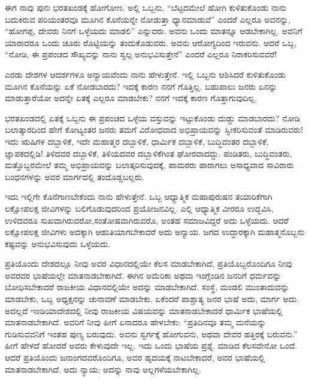 ಈಗ ನಾವು ಪುನಃ ಭರತಖಂಡಕ್ಕೆ ಹೋಗೋಣ. ಅಲ್ಲಿ ಒಬ್ಬನು, “ಬೆಟ್ಟದಮೇಲೆ ಹೋಗಿ ಕುಳಿತುಕೊಂಡು ನಾನು ಬದುಕಿರುವ ಪರಿಯಂತರವೂ ಮೂಗಿನ ಕೊನೆಯನ್ನೇ ನೋಡುತ್ತಾ ಧ್ಯಾನಮಾಡುವೆ” ಎಂದರೆ ಎಲ್ಲರೂ ಅವನನ್ನು, “ಹೋಗಪ್ಪ, ದೇವರು ನಿನಗೆ ಒಳ್ಳೆಯದು ಮಾಡಲಿ” ಎನ್ನುವರು. ಅವನು ಒಂದು ಮಾತನ್ನೂ ಆಡಬೇಕಾಗಿಲ್ಲ. ಅವನಿಗೆ ಯಾರಾದರೂ ಒಂದು ಚೂರು ರೊಟ್ಟಿಯನ್ನು ತಂದುಕೊಡುವರು. ಅವನು ಆರೋಗ್ಯದಿಂದ ಇರುವನು. ಆದರೆ ಒಬ್ಬ, “ನೋಡಿ, ಈ ಪ್ರಪಂಚದ ಸೌಖ್ಯವನ್ನು ನಾನು ಸ್ವಲ್ಪ ಅನುಭವಿಸುತ್ತೇನೆ” ಎಂದರೆ ಎಲ್ಲರೂ ನಿರಾಕರಿಸುವವರೆ!

ಎರಡು ದೇಶಗಳ ಆದರ್ಶಗಳೂ ಅನ್ಯಾಯವೆಂದು ನಾನು ಹೇಳುತ್ತೇನೆ. ಇಲ್ಲಿ ಒಬ್ಬನು ಆಶಿಸಿದರೆ ಕುಳಿತುಕೊಂಡು ಮೂಗಿನ ಕೊನೆಯನ್ನು ಏಕೆ ನೋಡಬಾರದು? ಇದಕ್ಕೆ ಕಾರಣ ನನಗೆ ಗೊತ್ತಿಲ್ಲ. ಬಹುಪಾಲು ಜನರು ಏನನ್ನು ಮಾಡುತ್ತಾರೆಯೋ ಅದನ್ನೇ ಏತಕ್ಕೆ ಎಲ್ಲರೂ ಮಾಡಬೇಕು? ನನಗೆ ಇದಕ್ಕೆ ಕಾರಣ ಗೊತ್ತಾಗುವುದಿಲ್ಲ.

ಭರತಖಂಡದಲ್ಲಿ ಏತಕ್ಕೆ ಒಬ್ಬನು ಈ ಪ್ರಪಂಚದ ಒಳ್ಳೆಯ ವಸ್ತುವನ್ನು ಇಟ್ಟುಕೊಂಡು ದುಡ್ಡು ಮಾಡಬಾರದು? ನೋಡಿ ಬಲಾತ್ಕಾರದಿಂದ ಹೇಗೆ ಕೋಟ್ಯಂತರ ಜನರು ತಮಗೆ ವಿರೋಧವಾದ ಅಭಿಪ್ರಾಯವನ್ನು ಸ್ವೀಕರಿಸುವಂತೆ ಮಾಡಿರುವರು! ಇದು ಋಷಿಗಳ ದಬ್ಬಾಳಿಕೆ, ಇದೇ ಮಹಾತ್ಮರ ದಬ್ಬಾಳಿಕೆ, ಧಾರ್ಮಿಕ ದಬ್ಬಾಳಿಕೆ, ಬುದ್ಧಿವಂತರ ದಬ್ಬಾಳಿಕೆ, ಜ್ಞಾಪಕದಲ್ಲಿಡಿ! ತಿಳಿದವರ ದಬ್ಬಾಳಿಕೆ, ತಿಳಿಯದವರ ದಬ್ಬಾಳಿಕೆಗಿಂತ ಘೋರವಾದದ್ದು. ಪಂಡಿತರು, ಬುದ್ಧಿವಂತರು, ಮತ್ತೊಬ್ಬರಮೇಲೆ ತಮ್ಮ ಅಭಿಪ್ರಾಯವನ್ನು ಬಲಾತ್ಕರಿಸುವುದಕ್ಕೆ, ಪಾಮರರು ಪಾರಾಗಲು ಅಸಾಧ್ಯವಾದ ಸಾವಿರಾರು ಬಂಧನಗಳನ್ನು ಅವರ ಮಾರ್ಗದಲ್ಲಿ ತಂದೊಡ್ಡಬಲ್ಲರು.

ಇದು ಇಲ್ಲಿಗೇ ಕೊನೆಗಾಣಬೇಕೆಂದು ನಾನು ಹೇಳುತ್ತೇನೆ. ಒಬ್ಬ ಆಧ್ಯಾತ್ಮಿಕ ಮಹಾಪುರುಷನ ತಯಾರಿಕೆಗಾಗಿ ಲಕ್ಷೋಪಲಕ್ಷ ಜೀವಿಗಳನ್ನು ಬಲಿಗೊಡುವುದರಿಂದ ಪ್ರಯೋಜನವಿಲ್ಲ. ಎಲ್ಲಿ ಆಧ್ಯಾತ್ಮಿಕ ವೀರರೂ ಉದ್ಭವಿಸಿ, ಉಳಿದವರೂ ಸುಖವಾಗಿರುವರೋ,\break ಸಂತೋಷವಾಗಿರುವರೊ, ಅಂತಹ ಸಮಾಜವಿದ್ದರೆ ಅದು ಒಳ್ಳೆಯದು. ಆದರೆ ಲಕ್ಷೋಪಲಕ್ಷ ಜೀವಿಗಳು ಅದಕ್ಕಾಗಿ ಆಹುತಿಯಾಗಬೇಕಾದರೆ ಅದು ಅನ್ಯಾಯ. ಜಗದ ಉದ್ಧಾರಕ್ಕಾಗಿ ಮಹಾತ್ಮನೊಬ್ಬನು ಕಷ್ಟವನ್ನು ಅನುಭವಿಸುವುದು ಒಳ್ಳೆಯದು.

ಪ್ರತಿಯೊಂದು ದೇಶದಲ್ಲೂ ನೀವು ಅವರ ವಿಧಾನದಲ್ಲಿಯೇ ಕೆಲಸ ಮಾಡಬೇಕಾಗಿದೆ, ಪ್ರತಿಯೊಬ್ಬರೊಂದಿಗೂ ನೀವು ಅವರವರ ಭಾಷೆಯಲ್ಲೇ ಮಾತನಾಡಬೇಕಾಗಿದೆ. ಈಗಿನ ಅಮೆರಿಕಾ ಅಥವಾ ಇಂಗ್ಲೆಂಡಿನ ಜನರಿಗೆ ಧರ್ಮವನ್ನು ಬೋಧಿಸಬೇಕಾದರೆ ರಾಜಕೀಯ ವಿಧಾನದಲ್ಲಿಯೇ ಅದನ್ನು ಮಾಡಬೇಕಾಗಿದೆ. ಸಂಸ್ಥೆ, ಮಂಡಲಿ ಮುಂತಾದುವನ್ನು ಮಾಡಬೇಕು, ಒಬ್ಬ ಅಧ್ಯಕ್ಷನನ್ನು ಚುನಾವಣೆ ಮಾಡಬೇಕು. ಏಕೆಂದರೆ ಪಾಶ್ಚಾತ್ಯ ಜನರ ಭಾಷೆ ಅದು, ಮಾರ್ಗ ಅದು. ಅದಲ್ಲದೆ ಇಂಡಿಯಾದೇಶದಲ್ಲಿ ನೀವು ರಾಜಕೀಯ ವಿಷಯವನ್ನು ಮಾತನಾಡಬೇಕಾದರೆ ಧಾರ್ಮಿಕ ಭಾಷೆಯಲ್ಲಿ ಮಾತನಾಡಬೇಕಾಗಿದೆ. ಅವರಿಗೆ ನೀವು ಹೀಗೆ ಏನಾದರೂ ಹೇಳಬೇಕು: “ಪ್ರತಿದಿನವೂ ತಮ್ಮ ಮನೆಯನ್ನು ಗುಡಿಸುವವನಿಗೆ ಇಂತಹ ಪುಣ್ಯ ಬರುವುದು. ಅವನು ಸ್ವರ್ಗಕ್ಕೆ ಹೋಗುವನು, ಅಥವಾ ದೇವರ ಹತ್ತಿರಕ್ಕೆ ಬರುವನು.” ಹೀಗೆ ಹೇಳದೆ ಹೋದರೆ ಅವರು ಕೇಳುವುದೇ ಇಲ್ಲ. ಇದು ಒಂದು ಭಾಷೆಯ ಪ್ರಶ್ನೆ. ಮಾಡಿದ ಕೆಲಸವೇನೋ ಒಂದೆ. ಆದರೆ ಪ್ರತಿಯೊಂದು ಜನಾಂಗದವರೊಂದಿಗೂ, ಅವರ ಹೃದಯಕ್ಕೆ ನಾಟಬೇಕಾದರೆ, ಅವರ ಭಾಷೆಯಲ್ಲಿ ಮಾತನಾಡಬೇಕಾಗಿದೆ. ಅದು ನ್ಯಾಯ; ಅದನ್ನು ನಾವು ಅಲ್ಲಗಳೆಯಬೇಕಾಗಿಲ್ಲ.

